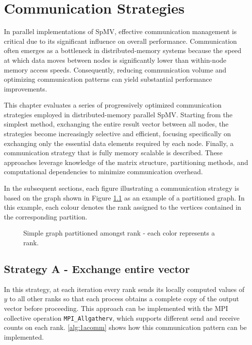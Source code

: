 \chapter{Communication Strategies}
In parallel implementations of SpMV, effective communication management is critical due to its significant influence on overall performance. Communication often emerges as a bottleneck in distributed-memory systems because the speed at which data moves between nodes is significantly lower than within-node memory access speeds. Consequently, reducing communication volume and optimizing communication patterns can yield substantial performance improvements.
\medskip

This chapter evaluates a series of progressively optimized communication strategies employed in distributed-memory parallel SpMV. Starting from the simplest method, exchanging the entire result vector between all nodes, the strategies become increasingly selective and efficient, focusing specifically on exchanging only the essential data elements required by each node. Finally, a communication strategy that is fully memory scalable is described. These approaches leverage knowledge of the matrix structure, partitioning methods, and computational dependencies to minimize communication overhead.
\medskip

In the subsequent sections, each figure illustrating a communication strategy is based on the graph shown in Figure \ref{fig:examplegraph} as an example of a partitioned graph. In this example, each colour denotes the rank assigned to the vertices contained in the corresponding partition.

\begin{figure}[H]
    \centering
    \caption{Simple graph partitioned amongst rank - each color represents a rank.}
    \label{fig:examplegraph}
\end{figure}

\section{Strategy A - Exchange entire vector}
In this strategy, at each iteration every rank sends its locally computed values of \(y\) to all other ranks so that each process obtains a complete copy of the output vector before proceeding. This approach can be implemented with the MPI collective operation \texttt{MPI\_Allgatherv}, which supports different send and receive counts on each rank. \autoref{alg:1acomm} shows how this communication pattern can be implemented.
\medskip

